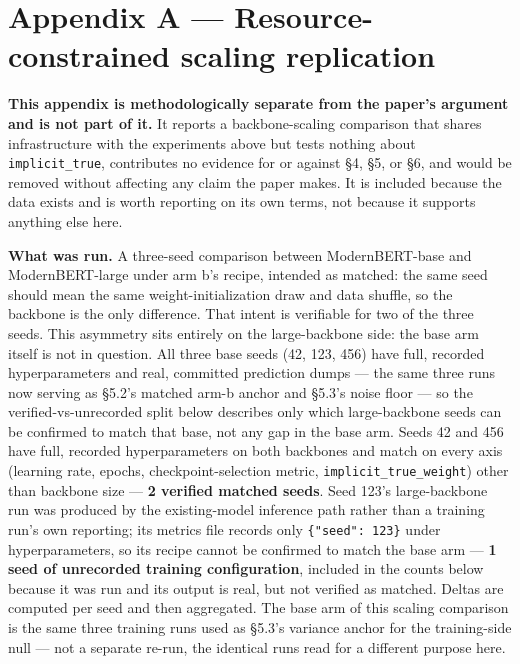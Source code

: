 \documentclass[11pt]{article}
\begin{document}
\section{Appendix A --- Resource-constrained scaling replication}\label{appendix-a-resource-constrained-scaling-replication}

\textbf{This appendix is methodologically separate from the paper's argument and is not part of
it.} It reports a backbone-scaling comparison that shares infrastructure with the
experiments above but tests nothing about \texttt{implicit\_true}, contributes no evidence for or
against §4, §5, or §6, and would be removed without affecting any claim the paper
makes. It is included because the data exists and is worth reporting on its own terms, not
because it supports anything else here.

\textbf{What was run.} A three-seed comparison between ModernBERT-base and ModernBERT-large
under arm b's recipe, intended as matched: the same seed should mean the same
weight-initialization draw and data shuffle, so the backbone is the only difference. That
intent is verifiable for two of the three seeds. This asymmetry sits entirely on the
large-backbone side: the base arm itself is not in question. All three base seeds (42, 123,
456) have full, recorded hyperparameters and real, committed prediction dumps --- the same
three runs now serving as §5.2's matched arm-b anchor and §5.3's noise floor --- so the
verified-vs-unrecorded split below describes only which large-backbone seeds can be
confirmed to match that base, not any gap in the base arm. Seeds 42 and 456 have full, recorded
hyperparameters on both backbones and match on every axis (learning rate, epochs,
checkpoint-selection metric, \texttt{implicit\_true\_weight}) other than backbone size --- \textbf{2
verified matched seeds}. Seed 123's large-backbone run was produced by the existing-model
inference path rather than a training run's own reporting; its metrics file records only
\texttt{\{"seed":\ 123\}} under hyperparameters, so its recipe cannot be confirmed to match the base
arm --- \textbf{1 seed of unrecorded training configuration}, included in the counts below because
it was run and its output is real, but not verified as matched. Deltas are computed per
seed and then aggregated. The base arm of this scaling comparison is the same three
training runs used as §5.3's variance anchor for the training-side null --- not a separate
re-run, the identical runs read for a different purpose here.
\end{document}
